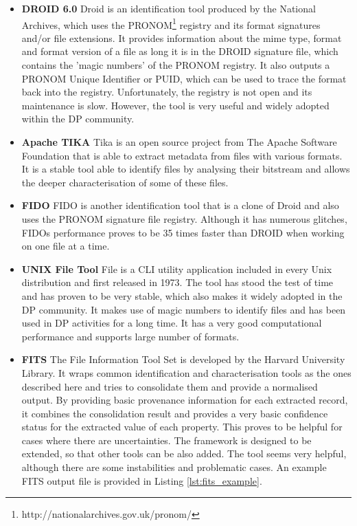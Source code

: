 \begin{itemize}
\item \textbf{DROID 6.0}\newline
Droid is an identification tool produced by the National Archives, which uses the PRONOM\footnote{http://nationalarchives.gov.uk/pronom/} registry and its format signatures and/or file extensions. It provides information about the mime type, format and format version of a file as long it is in the DROID signature file, which contains the 'magic numbers' of the PRONOM registry. It also outputs a PRONOM Unique Identifier or PUID, which can be used to trace the format back into the registry.
Unfortunately, the registry is not open and its maintenance is slow. However, the tool is very useful and widely adopted within the DP community.

\item \textbf{Apache TIKA}\newline
Tika is an open source project from The Apache Software Foundation that is able to extract metadata from files with various formats. It is a stable tool able to identify files by analysing their bitstream and allows the deeper characterisation of some of these files.  

\item \textbf{FIDO}\newline
FIDO is another identification tool that is a clone of Droid and also uses the PRONOM signature file registry. Although it has numerous glitches, FIDOs performance proves to be 35 times faster than DROID when working on one file at a time.

\item \textbf{UNIX File Tool}\newline
File is a CLI utility application included in every Unix distribution and first released in 1973. The tool has stood the test of time and has proven to be very stable, which also makes it widely adopted in the DP community. It makes use of magic numbers to identify files and has been used in DP activities for a long time. It has a very good computational performance and supports large number of formats.

\item \textbf{FITS} \newline
The File Information Tool Set is developed by the Harvard University Library. It wraps common identification and characterisation tools as the ones described here and tries to consolidate them and provide a normalised output. By providing basic provenance information for each extracted record, it combines the consolidation result and provides a very basic confidence status for the extracted value of each property. This proves to be helpful for cases where there are uncertainties. The framework is designed to be extended, so that other tools can be also added. The tool seems very helpful, although there are some instabilities and problematic cases. An example FITS output file is provided in Listing \ref{lst:fits_example}.


\end{itemize}
